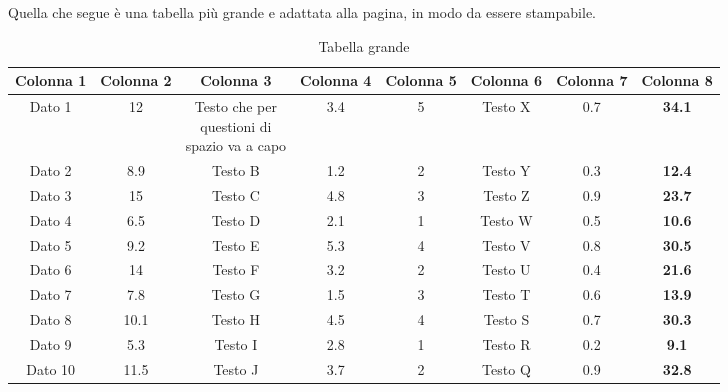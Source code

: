 Quella che segue è una tabella più grande e adattata alla pagina, in modo da essere stampabile.

\begin{table}[h!]
	\centering
    \small
	\begin{tabular}{| c | c | c | c | c | c | c || c |}
		\hline \textbf{Colonna 1} & \textbf{Colonna 2} & \textbf{Colonna 3} & \textbf{Colonna 4} & \textbf{Colonna 5} & \textbf{Colonna 6} & \textbf{Colonna 7} & \textbf{Colonna 8} \\ [0.5ex]
		\hline\hline
		Dato 1 & 12 & \makecell{Testo che per \\ questioni di \\ spazio va a capo} & 3.4 & 5 & Testo X & 0.7 & \textbf{34.1} \\
		\hline
		Dato 2 & 8.9 & Testo B & 1.2 & 2 & Testo Y & 0.3 & \textbf{12.4} \\
		\hline
		Dato 3 & 15 & Testo C & 4.8 & 3 & Testo Z & 0.9 & \textbf{23.7} \\
		\hline
        Dato 4 & 6.5 & Testo D & 2.1 & 1 & Testo W & 0.5 & \textbf{10.6} \\
        \hline
        Dato 5 & 9.2 & Testo E & 5.3 & 4 & Testo V & 0.8 & \textbf{30.5} \\
        \hline
        Dato 6 & 14 & Testo F & 3.2 & 2 & Testo U & 0.4 & \textbf{21.6} \\
        \hline
        Dato 7 & 7.8 & Testo G & 1.5 & 3 & Testo T & 0.6 & \textbf{13.9} \\
        \hline
        Dato 8 & 10.1 & Testo H & 4.5 & 4 & Testo S & 0.7 & \textbf{30.3} \\
        \hline
        Dato 9 & 5.3 & Testo I & 2.8 & 1 & Testo R & 0.2 & \textbf{9.1} \\
        \hline
        Dato 10 & 11.5 & Testo J & 3.7 & 2 & Testo Q & 0.9 & \textbf{32.8} \\
        \hline
	\end{tabular}
	\caption{Tabella grande}
	\label{capitolo2:tabellaGrande}
\end{table}
